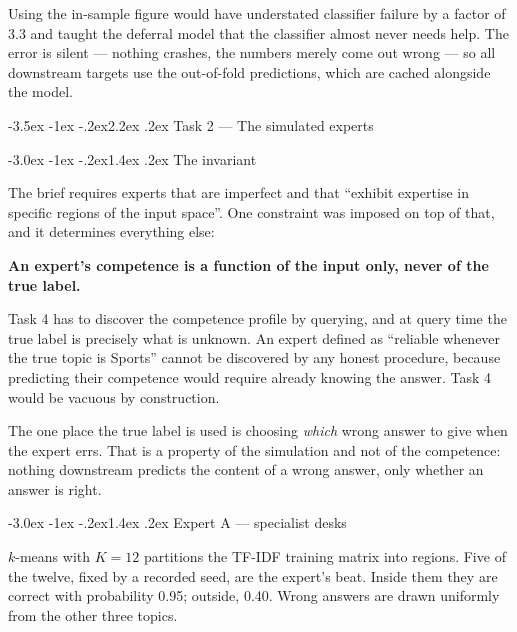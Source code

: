 \documentclass[11pt,a4paper]{article}
\makeatletter
\renewcommand\section{\@startsection{section}{1}{\z@}%
  {-3.5ex \@plus -1ex \@minus -.2ex}{2.2ex \@plus.2ex}%
  {\normalfont\Large\sffamily\bfseries\color{accent}}}
\renewcommand\subsection{\@startsection{subsection}{2}{\z@}%
  {-3.0ex \@plus -1ex \@minus -.2ex}{1.4ex \@plus .2ex}%
  {\normalfont\large\sffamily\bfseries\color{accent}}}
\newenvironment{callout}
  {\par\medskip\begin{lrbox}{\calloutbuf}%
   \begin{minipage}{\dimexpr\linewidth-24pt\relax}\setlength{\parskip}{0.4em}}
  {\end{minipage}\end{lrbox}%
   \noindent\colorbox{notebg}{\hspace{4pt}\usebox{\calloutbuf}\hspace{4pt}}\par\medskip}
\makeatother
\begin{document}
\begin{callout}
Using the in-sample figure would have understated classifier failure by a factor
of 3.3 and taught the deferral model that the classifier almost never needs help.
The error is silent --- nothing crashes, the numbers merely come out wrong --- so
all downstream targets use the out-of-fold predictions, which are cached
alongside the model.
\end{callout}

\section{Task 2 --- The simulated experts}

\subsection{The invariant}

The brief requires experts that are imperfect and that ``exhibit expertise in
specific regions of the input space''. One constraint was imposed on top of that,
and it determines everything else:

\begin{callout}
\textbf{An expert's competence is a function of the input only, never of the true
label.}

Task 4 has to discover the competence profile by querying, and at query time the
true label is precisely what is unknown. An expert defined as ``reliable whenever
the true topic is Sports'' cannot be discovered by any honest procedure, because
predicting their competence would require already knowing the answer. Task 4
would be vacuous by construction.
\end{callout}

The one place the true label is used is choosing \emph{which} wrong answer to
give when the expert errs. That is a property of the simulation and not of the
competence: nothing downstream predicts the content of a wrong answer, only
whether an answer is right.

\subsection{Expert A --- specialist desks}

$k$-means with $K = 12$ partitions the TF-IDF training matrix into regions. Five
of the twelve, fixed by a recorded seed, are the expert's beat. Inside them they
are correct with probability 0.95; outside, 0.40. Wrong answers are drawn
uniformly from the other three topics.
\end{document}
